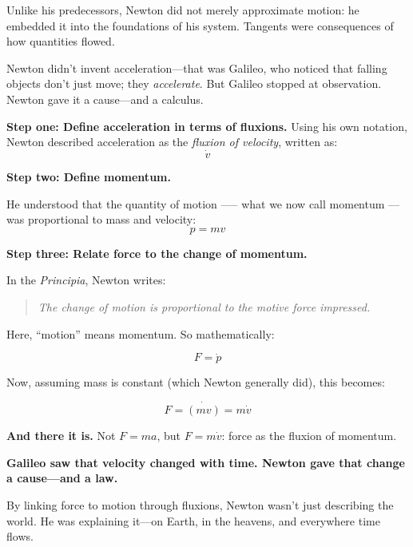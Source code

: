 Unlike his predecessors, Newton did not merely approximate motion: he embedded it into the foundations of his system. 
Tangents were consequences of how quantities flowed.

Newton didn’t invent acceleration—that was Galileo, who noticed that falling objects don’t just move; they \textit{accelerate}. 
But Galileo stopped at observation. Newton gave it a cause—and a calculus.
  
\textbf{Step one: Define acceleration in terms of fluxions.}  
Using his own notation, Newton described acceleration as the \textit{fluxion of velocity}, written as:
\[
\dot{v}
\]

\textbf{Step two: Define momentum.}  

He understood that the quantity of motion --— what we now call momentum --- was proportional to mass and velocity:
\[
p = m v
\]

\textbf{Step three: Relate force to the change of momentum.}  

In the \textit{Principia}, Newton writes:

\begin{quote}
\textit{The change of motion is proportional to the motive force impressed.}
\end{quote}

Here, “motion” means momentum. So mathematically:

\[
F = \dot{p}
\]

Now, assuming mass is constant (which Newton generally did), this becomes:

\[
F = \dot{(mv)} = m\dot{v}
\]

\textbf{And there it is.} Not \( F = ma \), but \( F = m\dot{v} \): force as the fluxion of momentum.

\textbf{Galileo saw that velocity changed with time. Newton gave that change a cause—and a law.}

By linking force to motion through fluxions, Newton wasn’t just describing the world. 
He was explaining it—on Earth, in the heavens, and everywhere time flows.


